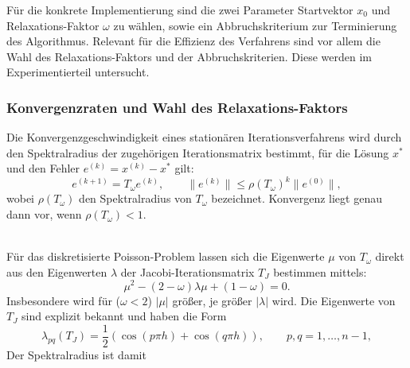 \documentclass[11pt,a4paper]{article}
\begin{document}

Für die konkrete Implementierung sind die zwei Parameter Startvektor \(x_0\) und Relaxations-Faktor \(\omega\) zu wählen, sowie ein Abbruchskriterium zur Terminierung des Algorithmus. Relevant für die Effizienz des Verfahrens sind vor allem die Wahl des Relaxations-Faktors und der Abbruchskriterien. Diese werden im Experimentierteil untersucht. 
\subsubsection{Konvergenzraten und Wahl des Relaxations-Faktors}

Die Konvergenzgeschwindigkeit eines stationären Iterationsverfahrens wird durch den Spektralradius der zugehörigen Iterationsmatrix bestimmt, für die Lösung \(x^\ast\) und den Fehler \(e^{(k)} = x^{(k)} - x^\ast\) gilt:
\[
e^{(k+1)} = T_\omega e^{(k)}, \qquad 
\|e^{(k)}\| \le \rho(T_\omega)^k \|e^{(0)}\|,
\]
wobei \(\rho(T_\omega)\) den Spektralradius von \(T_\omega\) bezeichnet. Konvergenz liegt genau dann vor, wenn \(\rho(T_\omega) < 1\). %

\\

Für das diskretisierte Poisson-Problem lassen sich die Eigenwerte \(\mu\) von \(T_{\omega}\) direkt aus den Eigenwerten \(\lambda\) der Jacobi-Iterationsmatrix \(T_J\) bestimmen mittels: 
\[\mu^2 - (2-\omega)\lambda \mu + (1-\omega) = 0.\]
Insbesondere wird für (\(\omega < 2\)) \(|\mu|\) größer, je größer \(|\lambda|\) wird.
Die Eigenwerte von \(T_J\) sind explizit bekannt und haben die Form
\[
\lambda_{pq}(T_J)
= \frac12\left( \cos(p\pi h) + \cos(q\pi h) \right),
\qquad p,q = 1,\dots,n-1,
\]
Der Spektralradius ist damit
\end{document}

